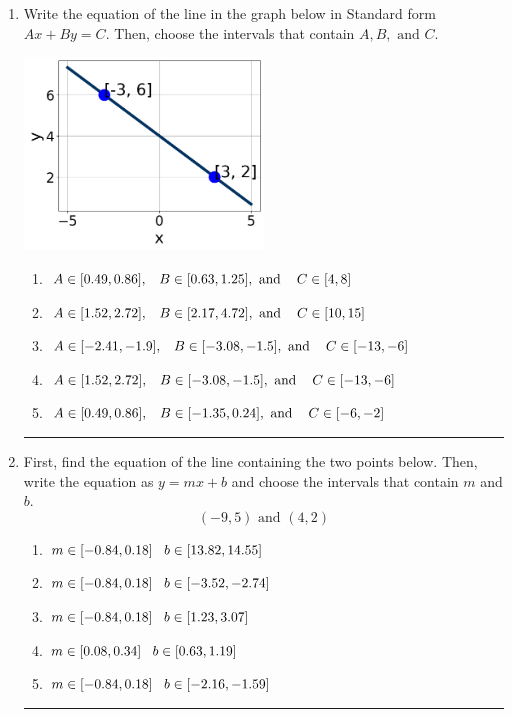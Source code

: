 \documentclass[14pt]{extbook}
\newcommand{\litem}[1]{\item#1\hspace*{-1cm}\rule{\textwidth}{0.4pt}}
\begin{document}
\begin{enumerate}
{\begin{enumerate}[label=\Alph*.]
\end{enumerate} }
\litem{
Write the equation of the line in the graph below in Standard form $Ax+By=C$. Then, choose the intervals that contain $A, B, \text{ and } C$.
\begin{center}
    \includegraphics[width=0.5\textwidth]{../Figures/linearGraphToStandardCopyB.png}
\end{center}
\begin{enumerate}[label=\Alph*.]
\item \( A \in [0.49, 0.86], \hspace{3mm} B \in [0.63, 1.25], \text{ and } \hspace{3mm} C \in [4, 8] \)
\item \( A \in [1.52, 2.72], \hspace{3mm} B \in [2.17, 4.72], \text{ and } \hspace{3mm} C \in [10, 15] \)
\item \( A \in [-2.41, -1.9], \hspace{3mm} B \in [-3.08, -1.5], \text{ and } \hspace{3mm} C \in [-13, -6] \)
\item \( A \in [1.52, 2.72], \hspace{3mm} B \in [-3.08, -1.5], \text{ and } \hspace{3mm} C \in [-13, -6] \)
\item \( A \in [0.49, 0.86], \hspace{3mm} B \in [-1.35, 0.24], \text{ and } \hspace{3mm} C \in [-6, -2] \)

\end{enumerate} }
\litem{
First, find the equation of the line containing the two points below. Then, write the equation as $ y=mx+b $ and choose the intervals that contain $m$ and $b$.\[ (-9, 5) \text{ and } (4, 2) \]\begin{enumerate}[label=\Alph*.]
\item \( m \in [-0.84, 0.18] \hspace*{3mm} b \in [13.82, 14.55] \)
\item \( m \in [-0.84, 0.18] \hspace*{3mm} b \in [-3.52, -2.74] \)
\item \( m \in [-0.84, 0.18] \hspace*{3mm} b \in [1.23, 3.07] \)
\item \( m \in [0.08, 0.34] \hspace*{3mm} b \in [0.63, 1.19] \)
\item \( m \in [-0.84, 0.18] \hspace*{3mm} b \in [-2.16, -1.59] \)


\end{enumerate}}
\end{enumerate}
\end{document}
